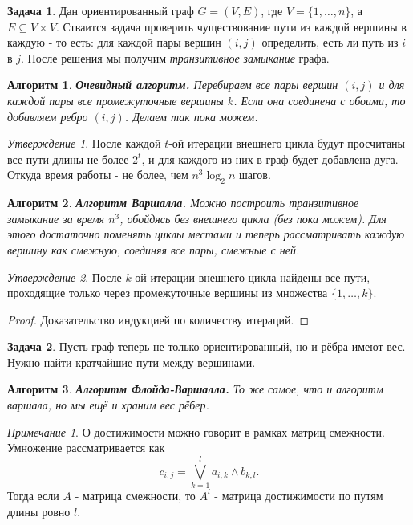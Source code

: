 \documentclass[a4paper]{article}
\theoremstyle{indented}
\newtheorem{alg}{Алгоритм}
\theoremstyle{definition}
\newtheorem{prob}{Задача}
\theoremstyle{remark}
\newtheorem{remark}{Примечание}
\newtheorem{stat}{Утверждение}
\begin{document}
\begin{prob}
    Дан ориентированный граф $G=(V, E)$, где $V = \{1, \ldots, n\}$, а $E\subseteq V \times V$. Стваится задача проверить чуществование пути из каждой вершины в каждую - то есть: для каждой пары вершин $(i, j)$ определить, есть ли путь из $i$ в $j$. После решения мы получим \textit{транзитивное замыкание} графа.
\end{prob}

\begin{alg}
    \textbf{Очевидный алгоритм.} Перебираем все пары вершин $(i, j)$ и для каждой пары все промежуточные вершины $k$. Если она соединена с обоими, то добавляем ребро $(i, j)$. Делаем так пока можем.
\end{alg}

\begin{stat}
    После каждой $t$-ой итерации внешнего цикла будут просчитаны все пути длины не более $2^t$, и для каждого из них в граф будет добавлена дуга. Откуда время работы - не более, чем $n^3 \log_2 n$ шагов.
\end{stat}

\begin{alg}
    \textbf{Алгоритм Варшалла.} Можно построить транзитивное замыкание за время $n^3$, обойдясь без внешнего цикла (без пока можем). Для этого достаточно поменять циклы местами и теперь рассматривать каждую вершину как смежную, соединяя все пары, смежные с ней.
\end{alg}

\begin{stat}
    После $k$-ой итерации внешнего цикла найдены все пути, проходящие только через промежуточные вершины из множества $\{1, \ldots, k\}$. 
\end{stat}

\begin{proof}
    Доказательство индукцией по количеству итераций.
\end{proof}

\begin{prob}
    Пусть граф теперь не только ориентированный, но и рёбра имеют вес. Нужно найти кратчайшие пути между вершинами.
\end{prob}

\begin{alg}
    \textbf{Алгоритм Флойда-Варшалла.} То же самое, что и алгоритм варшала, но мы ещё и храним вес рёбер.
\end{alg}

\begin{remark}
    О достижимости можно говорит в рамках матриц смежности. Умножение рассматривается как 
    \[
        c_{i, j}=\bigvee_{k=1}^l a_{i, k}\wedge b_{k, l}. 
    \]
    Тогда если $A$ - матрица смежности, то $A^l$ - матрица достижимости по путям длины ровно $l$. 
\end{remark}
\end{document}
